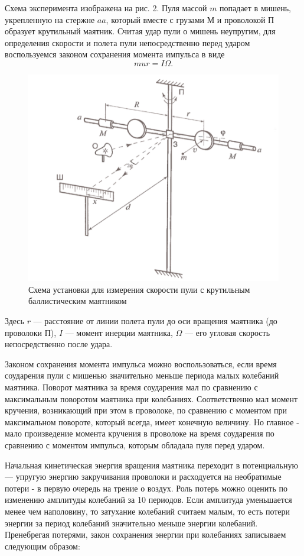 Схема эксперимента изображена на рис. 2. Пуля массой $m$
попадает в мишень, укрепленную на стержне $aa$, который вместе
с грузами $М$ и проволокой П образует крутильный маятник.
Считая удар пули о мишень неупругим, для определения скорости
и полета пули непосредственно перед ударом воспользуемся
законом сохранения момента импульса в виде
\[mur = I\Omega.\]
\begin{figure}[H]
    \centering
\includegraphics[width=1.\linewidth,center]{p2.jpeg}
    \caption{Схема установки для измерения скорости пули с крутильным баллистическим маятником}
    \label{fig:my_label}
\end{figure}
Здесь $r$ — расстояние от линии полета пули до оси вращения
маятника (до проволоки П), $I$ — момент инерции маятника,
$\Omega$ — его угловая скорость непосредственно после удара.

Законом сохранения момента импульса можно воспользоваться, если
время соударения пули с мишенью значительно меньше периода малых
колебаний маятника. Поворот маятника за время соударения мал по
сравнению с максимальным поворотом маятника при колебаниях.
Соответственно мал момент кручения, возникающий при этом в
проволоке, по сравнению с моментом при максимальном повороте,
который всегда, имеет конечную величину. Но главное - мало
произведение момента кручения в проволоке на время соударения
по сравнению с моментом импульса, которым обладала пуля перед
ударом.

Начальная кинетическая энергия вращения маятника переходит в
потенциальную — упругую энергию закручивания проволоки и
расходуется на необратимые потери - в первую очередь на трение о
воздух. Роль потерь можно оценить по изменению амплитуды
колебаний за 10 периодов. Если амплитуда уменьшается менее чем
наполовину, то затухание колебаний считаем малым, то есть
потери энергии за период колебаний значительно меньше
энергии колебаний. Пренебрегая потерями, закон сохранения
энергии при колебаниях записываем следующим образом:

